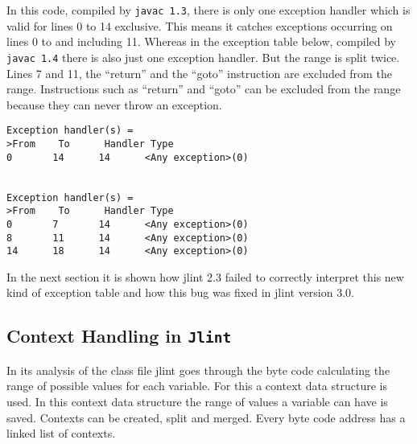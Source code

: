 \documentclass[11pt,twoside,a4paper,draft]{article}
\begin{document}
In this code, compiled by \texttt{javac 1.3}, there is only one exception 
handler which is valid for lines 0 to 14 exclusive. This means it catches
exceptions occurring on lines 0 to and including 11. Whereas in the
exception table below, compiled by \texttt{javac 1.4} there is also
just one exception handler. But the range is split twice.
Lines 7 and 11, the ``return'' and the ``goto'' instruction
are excluded from the range. 
Instructions such as ``return'' and ``goto'' can be excluded from the range
because they can never throw an exception.


\begin{verbatim}
Exception handler(s) =
>From    To      Handler Type
0       14      14      <Any exception>(0)


Exception handler(s) =
>From    To      Handler Type
0       7       14      <Any exception>(0)
8       11      14      <Any exception>(0)
14      18      14      <Any exception>(0)

\end{verbatim}

In the next section it is shown how jlint 2.3 
failed to correctly interpret this new kind of exception table and how this
bug was fixed in jlint version 3.0. 


\subsection {Context Handling in \texttt{Jlint}}

In its analysis of the class file jlint goes through the byte code calculating
the range of possible values for each variable. For this a context 
data structure is used. In this context data structure the range of 
values a variable  can have is saved. Contexts can be created, split and 
merged. Every byte code address has a linked list of contexts.
\end{document}
